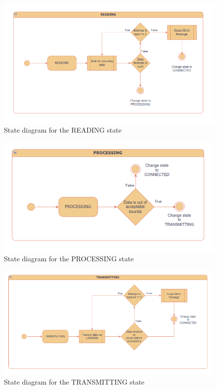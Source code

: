 \begin{figure}[H]
	\centering
	\includegraphics[scale=0.8]{diagrams/states_reading}
	\caption{State diagram for the READING state}
	\label{fig:states_reading}
\end{figure}

\begin{figure}[H]
	\centering
	\includegraphics[scale=0.8]{diagrams/states_processing}
	\caption{State diagram for the PROCESSING state}
	\label{fig:states_processing}
\end{figure}

\begin{figure}[H]
	\centering
	\includegraphics[scale=0.8]{diagrams/states_transmitting}
	\caption{State diagram for the TRANSMITTING state}
	\label{fig:states_transmitting}
\end{figure}

